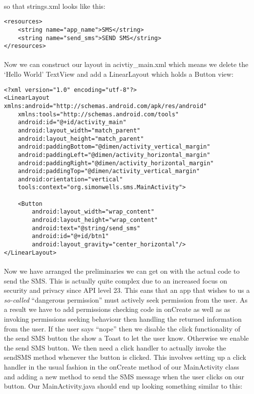 \paragraph{} so that strings.xml looks like this:

\begin{lstlisting}
<resources>
    <string name="app_name">SMS</string>
    <string name="send_sms">SEND SMS</string>
</resources>
\end{lstlisting}


\paragraph{} Now we can construct our layout in acivtiy\_main.xml which means we delete the `Hello World' TextView and add a LinearLayout which holds a Button view:

\begin{lstlisting}
<?xml version="1.0" encoding="utf-8"?>
<LinearLayout xmlns:android="http://schemas.android.com/apk/res/android"
    xmlns:tools="http://schemas.android.com/tools"
    android:id="@+id/activity_main"
    android:layout_width="match_parent"
    android:layout_height="match_parent"
    android:paddingBottom="@dimen/activity_vertical_margin"
    android:paddingLeft="@dimen/activity_horizontal_margin"
    android:paddingRight="@dimen/activity_horizontal_margin"
    android:paddingTop="@dimen/activity_vertical_margin"
    android:orientation="vertical"
    tools:context="org.simonwells.sms.MainActivity">

    <Button
        android:layout_width="wrap_content"
        android:layout_height="wrap_content"
        android:text="@string/send_sms"
        android:id="@+id/btn1"
        android:layout_gravity="center_horizontal"/>
</LinearLayout>
\end{lstlisting}

\paragraph{} Now we have arranged the preliminaries we can get on with the actual code to send the SMS. This is actually quite complex due to an increased focus on security and privacy since API level 23. This eans that an app that wishes to us a \emph{so-called} ``dangerous permission'' must actively seek permission from the user. As a result we have to add permissions checking code in onCreate as well as as invoking permissions seeking behaviour then handling the returned information from the user. If the user says ``nope'' then we disable the click functionality of the send SMS button the show a Toast to let the user know. Otherwise we enable the send SMS button. We then need a click handler to actually invoke the sendSMS method whenever the button is clicked. This involves setting up a click handler in the usual fashion in the onCreate method of our MainActivity class and adding a new method to send the SMS message when the user clicks on our button. Our MainActivity.java should end up looking something similar to this:

